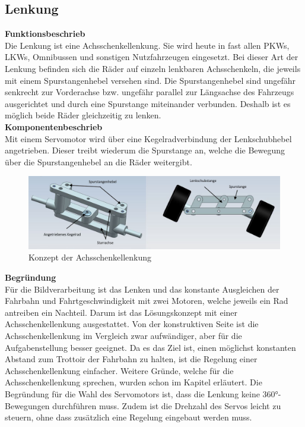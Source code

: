 \subsection{Lenkung}
\textbf{Funktionsbeschrieb}\\[0.2cm]
Die Lenkung ist eine Achsschenkellenkung. Sie wird heute in fast allen PKWs, LKWs, Omnibussen und sonstigen Nutzfahrzeugen eingesetzt. Bei dieser Art der Lenkung befinden sich die Räder auf einzeln lenkbaren Achsschenkeln, die jeweils mit einem Spurstangenhebel versehen sind. Die Spurstangenhebel sind ungefähr senkrecht zur Vorderachse bzw. ungefähr parallel zur Längsachse des Fahrzeugs ausgerichtet und durch eine Spurstange miteinander verbunden. Deshalb ist es möglich beide Räder gleichzeitig zu lenken.\\[0.2cm]
\textbf{Komponentenbeschrieb}\\[0.2cm]
Mit einem Servomotor wird über eine Kegelradverbindung der Lenkschubhebel angetrieben. Dieser treibt wiederum die Spurstange an, welche die Bewegung über die Spurstangenhebel an die Räder weitergibt.
\begin{figure}[H]%
\centering
\includegraphics[width=1\textwidth]{03_Loesungskonzept/pictures/Achsschenkellenkung.png}
\caption{Konzept der Achsschenkellenkung}
\label{fig:activityRoute}
\end{figure}\flushleft
\textbf{Begründung}\\[0.2cm]
Für die Bildverarbeitung ist das Lenken und das konstante Ausgleichen der Fahrbahn und Fahrtgeschwindigkeit mit zwei Motoren, welche jeweils ein Rad antreiben ein Nachteil. Darum ist das Lösungskonzept mit einer Achsschenkellenkung ausgestattet. Von der konstruktiven Seite ist die Achsschenkellenkung im Vergleich zwar aufwändiger, aber für die Aufgabenstellung besser geeignet. Da es das Ziel ist, einen möglichst konstanten Abstand zum Trottoir der Fahrbahn zu halten, ist die Regelung einer Achsschenkellenkung einfacher. Weitere Gründe, welche für die Achsschenkellenkung sprechen, wurden schon im Kapitel \grqq{} erläutert.
Die Begründung für die Wahl des Servomotors ist, dass die Lenkung keine 360°-Bewegungen durchführen muss. Zudem ist die Drehzahl des Servos leicht zu steuern, ohne dass zusätzlich eine Regelung eingebaut werden muss. \\[0.2cm]
